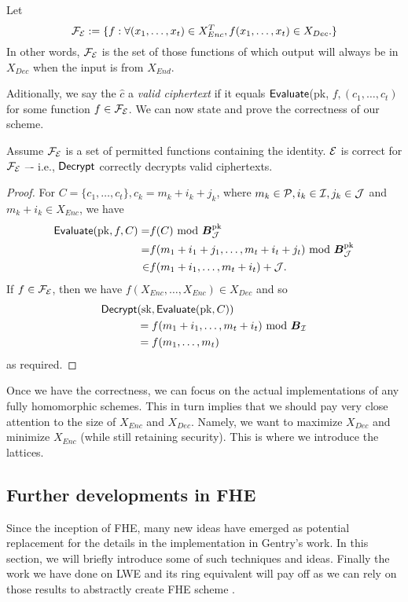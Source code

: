 \begin{definition}
	Let
	\[ \mathcal{F}_{\mathcal{E}} := \{ f : \forall (x_1, \ldots, x_t) \in X_{Enc}^T, f(x_1, \ldots, x_t) \in X_{Dec}. \} \]
	In other words, $\mathcal{F}_{\mathcal{E}}$ is the set of those functions of which output will always be in $X_{Dec}$ when the input is from $X_{End}$.
\end{definition}
Aditionally, we say the $\hat{c}$ a \textit{valid ciphertext} if it equals $\textsf{Evaluate}$(pk, $f, (c_1, \ldots, c_t)$ for some function $f \in \mathcal{F}_{\mathcal{E}}$. We can now state and prove the correctness of our scheme.
\begin{theorem}[Correctness]
	Assume $\mathcal{F}_{\mathcal{E}}$ is a set of permitted functions containing the identity. $\mathcal{E}$ is correct for $\mathcal{F}_{\mathcal{E}}$ –- i.e., $\textsf{Decrypt}$ correctly decrypts valid ciphertexts.
\end{theorem}
\begin{proof}
	For $C = \{c_1, \ldots, c_t\}, c_k = m_k +i_k +j_k$, where $m_k \in \mathcal{P}, i_k \in \mathcal{I}, j_k \in \mathcal{J}$ and $m_k +i_k \in X_{Enc}$, we have
	\begin{align*}
		\textsf{Evaluate}(\text{pk}, f, C) = & f(C) \text{ mod } \boldsymbol{B}_{\mathcal{J}}^{\text{pk}} \\
		= & f(m_1 +i_1 +j_1, \ldots, m_t+i_t+j_t) \text{ mod } \boldsymbol{B}_{\mathcal{J}}^{\text{pk}} \\	
		\in & f(m_1 +i_1, \ldots, m_t +i_t) + \mathcal{J}.
	\end{align*}
	If $f \in \mathcal{F}_{\mathcal{E}}$, then we have $f(X_{Enc}, \ldots, X_{Enc}) \in X_{Dec}$ and so
	\begin{align*}
		\textsf{Decrypt} & (\text{sk}, \textsf{Evaluate}(\text{pk}, C)) \\
		& = f(m_1+i_1, \ldots, m_t +i_t) \text{ mod } \boldsymbol{B}_{\mathcal{I}} \\
		& = f(m_1, \ldots, m_t)
	\end{align*}
	as required.
\end{proof}

Once we have the correctness, we can focus on the actual implementations of any fully homomorphic schemes. This in turn implies that we should pay very close attention to the size of $X_{Enc}$ and $X_{Dec}$. Namely, we want to maximize $X_{Dec}$ and minimize $X_{Enc}$ (while still retaining security). This is where we introduce the lattices.

\subsection{Further developments in FHE}
Since the inception of FHE, many new ideas have emerged as potential replacement for the details in the implementation in Gentry's work. In this section, we will briefly introduce some of such techniques and ideas. Finally the work we have done on LWE and its ring equivalent will pay off as we can rely on those results to abstractly create FHE scheme . 

